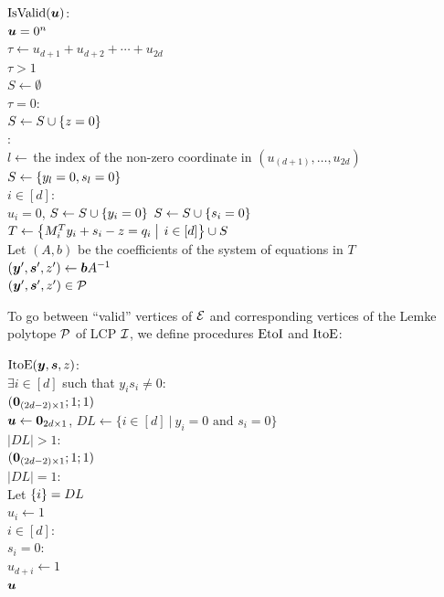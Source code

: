 \begin{algo}
  \underline{$\mbox{IsValid}(\mbox{\boldmath $u$})$}:\+
  \\\IfB $\mbox{\boldmath $u$} = 0^n$ \ThenB \ReturnB \True
  \\$\tau \gets u_{d+1} + u_{d+2} + \dotsb + u_{2d}$
  \\\IfB $\tau > 1$ \ThenB \ReturnB \False\-
  \\$S\gets \emptyset$\quad {}
  \\\IfB $\tau = 0$:\+
  \\  $S \gets S \cup \left\{ z=0 \right\}$\-
  \\\ElseB:\quad{}\+
  \\  $l\gets$\,the index of the non-zero coordinate in $(u_{(d+1)},\dots,u_{2d})$
  \\  $S\gets \left\{ y_l = 0, s_l = 0 \right\}$\-
  \\\ForB $i \in [d]$:\+
  \\  \IfB $u_i = 0$, \ThenB $S\gets S\cup \left\{ y_i = 0 \right\}$ \ElseB $S\gets S\cup \left\{ s_i = 0 \right\}$\-
  \\$T \gets \Setbar{M^T_i y_i + s_i - z = q_i}{i\in [d]} \cup S$
  \\Let $(A,b)$ be the coefficients of the system of equations in $T$
  \\$(\mbox{\boldmath $y$}',\mbox{\boldmath $s$}',z') \gets \mbox{\boldmath $b$} A^{-1}$
  \\\ReturnB $(\mbox{\boldmath $y$}',\mbox{\boldmath $s$}',z') \in \mbox{${\mathcal P}$}$
\end{algo}

To go between ``valid'' vertices of $\mbox{${\mathcal E}$}$ and corresponding vertices of the Lemke polytope
$\mbox{${\mathcal P}$}$ of LCP $\mbox{${\mathcal I}$}$, we define procedures $\mbox{EtoI}$ and $\mbox{ItoE}$:

\begin{algo}
  \underline{$\mbox{ItoE}(\mbox{\boldmath $y$},\mbox{\boldmath $s$},z)$}:\+
  \\\IfB $\exists i \in [d]$ such that $y_i s_i \neq 0$:\+
  \\  \ReturnB $(\mbox{\boldmath $0$}_{(2d-2)\times 1};1;1)$\-
  \\$\mbox{\boldmath $u$}\gets \mbox{\boldmath $0$}_{2d\times 1}$, $DL\gets \{i\in [d]\ |\ y_i=0\mbox{ and } s_i=0\}$
  \\\IfB $|DL|>1$:\+
  \\  \ReturnB $(\mbox{\boldmath $0$}_{(2d-2)\times 1};1;1)$ \-
  \\\IfB $|DL|=1$:\+
  \\  Let $\left\{ i \right\} = DL$
  \\  $u_i\gets 1$\-
  \\\ForB $i\in [d]$:\+
  \\  \IfB $s_i=0$:\+
  \\    $u_{d+i}\gets 1$\-\-
  \\\ReturnB $\mbox{\boldmath $u$}$
\end{algo}

